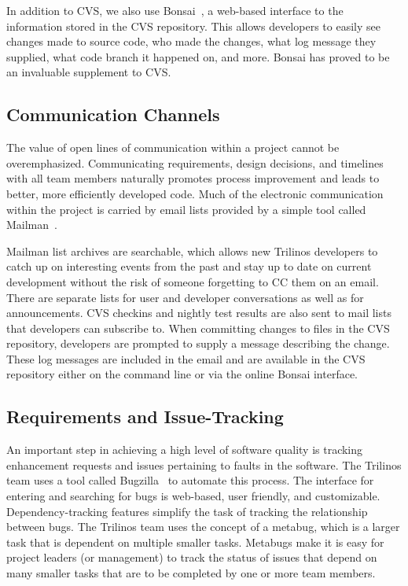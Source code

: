 \documentclass{doublecol}
\begin{document}
In addition to CVS, we also use Bonsai~\cite{Bonsai}, a web-based
interface to the information stored in the CVS repository.  This
allows developers to easily see changes made to source code, who
made the changes, what log message they supplied, what code branch
it happened on, and more.  Bonsai has proved to be an invaluable
supplement to CVS.

\subsection{Communication Channels}


The value of open lines of communication within a project cannot be
overemphasized.  Communicating requirements, design decisions, and
timelines with all team members naturally promotes process
improvement and leads to better, more efficiently developed code.
Much of the electronic communication within the project is carried
by email lists provided by a simple tool called
Mailman~\cite{Mailman}.

Mailman list archives are  searchable, which allows new Trilinos
developers to catch up on interesting events from the past and stay
up to date on current development without the risk of someone
forgetting to CC them on an email. There are separate lists for user
and developer conversations as well as for announcements. CVS
checkins and nightly test results are also sent to mail lists that
developers can subscribe to.  When committing changes to files in
the CVS repository, developers are prompted to supply a message
describing the change.  These log messages are included in the email
and are available in the CVS repository either on the command line
or via the online Bonsai interface.

\subsection{Requirements and Issue-Tracking}


An important step in achieving a high level of software quality is
tracking enhancement requests and issues pertaining to faults in the
software.  The Trilinos team uses a tool called
Bugzilla~\cite{Bugzilla} to automate this process.  The interface
for entering and searching for bugs is web-based, user friendly, and
customizable.  Dependency-tracking features simplify the task of
tracking the relationship between bugs.  The Trilinos team uses the
concept of a metabug, which is a larger task that is dependent on
multiple smaller tasks. Metabugs make it is easy for project leaders
(or management) to track the status of issues that depend on many
smaller tasks that are to be completed by one or more team members.
\end{document}
